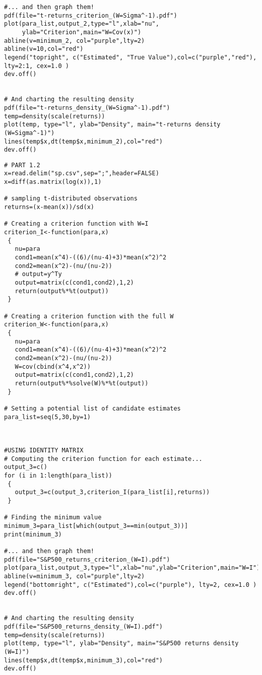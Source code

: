 \begin{appendices}
\begin{verbatim}
#... and then graph them!
pdf(file="t-returns_criterion_(W=Sigma^-1).pdf")
plot(para_list,output_2,type="l",xlab="nu",
     ylab="Criterion",main="W=Cov(x)")
abline(v=minimum_2, col="purple",lty=2)
abline(v=10,col="red")
legend("topright", c("Estimated", "True Value"),col=c("purple","red"), lty=2:1, cex=1.0 )
dev.off()


# And charting the resulting density
pdf(file="t-returns_density_(W=Sigma^-1).pdf")
temp=density(scale(returns))
plot(temp, type="l", ylab="Density", main="t-returns density (W=Sigma^-1)")
lines(temp$x,dt(temp$x,minimum_2),col="red")
dev.off()

\end{verbatim}

\newpage
\begin{verbatim}
# PART 1.2
x=read.delim("sp.csv",sep=";",header=FALSE)
x=diff(as.matrix(log(x)),1)

# sampling t-distributed observations
returns=(x-mean(x))/sd(x)
       
# Creating a criterion function with W=I
criterion_I<-function(para,x)
 {
   nu=para
   cond1=mean(x^4)-((6)/(nu-4)+3)*mean(x^2)^2
   cond2=mean(x^2)-(nu/(nu-2))
   # output=y^Ty
   output=matrix(c(cond1,cond2),1,2)
   return(output%*%t(output))
 }
       
# Creating a criterion function with the full W
criterion_W<-function(para,x)
 {
   nu=para
   cond1=mean(x^4)-((6)/(nu-4)+3)*mean(x^2)^2
   cond2=mean(x^2)-(nu/(nu-2))
   W=cov(cbind(x^4,x^2))
   output=matrix(c(cond1,cond2),1,2)
   return(output%*%solve(W)%*%t(output))
 }
       
# Setting a potential list of candidate estimates
para_list=seq(5,30,by=1)
     
       
       
#USING IDENTITY MATRIX
# Computing the criterion function for each estimate...
output_3=c()
for (i in 1:length(para_list))
 {
   output_3=c(output_3,criterion_I(para_list[i],returns))
 }
       
# Finding the minimum value
minimum_3=para_list[which(output_3==min(output_3))]
print(minimum_3)

#... and then graph them!
pdf(file="S&P500_returns_criterion_(W=I).pdf")
plot(para_list,output_3,type="l",xlab="nu",ylab="Criterion",main="W=I")
abline(v=minimum_3, col="purple",lty=2)
legend("bottomright", c("Estimated"),col=c("purple"), lty=2, cex=1.0 )
dev.off()

       
# And charting the resulting density
pdf(file="S&P500_returns_density_(W=I).pdf")
temp=density(scale(returns))
plot(temp, type="l", ylab="Density", main="S&P500 returns density (W=I)")
lines(temp$x,dt(temp$x,minimum_3),col="red")       
dev.off()



\end{verbatim}
\end{appendices}
